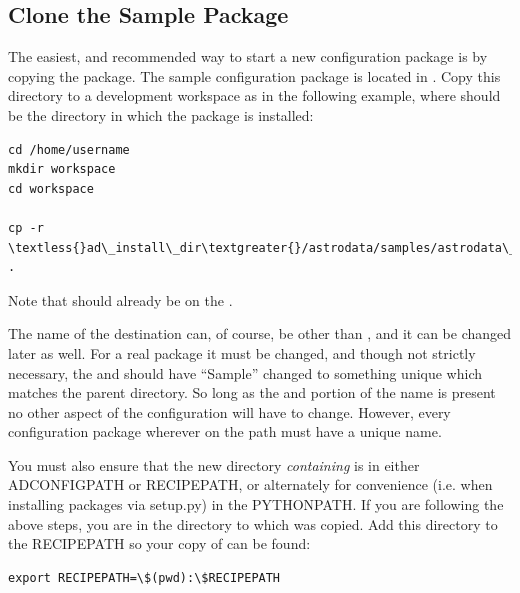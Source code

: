 \documentclass[letterpaper,10pt,english]{sphinxmanual}
\begin{document}
\subsection{Clone the Sample Package}
\label{startingTheConfig:clone-the-sample-package}
The easiest, and recommended way to start a new configuration package is by copying the
 package. The sample configuration package is located in
. Copy this directory to a development workspace
as in the following example, where  should be the directory in
which the  package is installed:

\begin{Verbatim}[commandchars=\\\{\}]
cd /home/username
mkdir workspace
cd workspace

cp -r \textless{}ad\_install\_dir\textgreater{}/astrodata/samples/astrodata\_Sample .
\end{Verbatim}

Note that  should already be on the .

The name of the destination can, of course, be other than ,
and it can be changed later as well. For a real package it must be changed, and
though not strictly necessary, the  and  should
have ``Sample'' changed to something unique which matches the parent
 directory. So long as the  and 
portion of the name is present no other aspect of the configuration will have to
change. However, every configuration package wherever on the
path must have a unique name.

You must also ensure that the new directory \emph{containing}
 is in either ADCONFIGPATH or RECIPEPATH, or alternately
for convenience (i.e. when installing packages via setup.py) in the PYTHONPATH.
If you are following the above steps, you are in the directory to which
 was copied. Add this directory to the RECIPEPATH so your copy
of  can be found:

\begin{Verbatim}[commandchars=\\\{\}]
export RECIPEPATH=\$(pwd):\$RECIPEPATH
\end{Verbatim}
\end{document}
